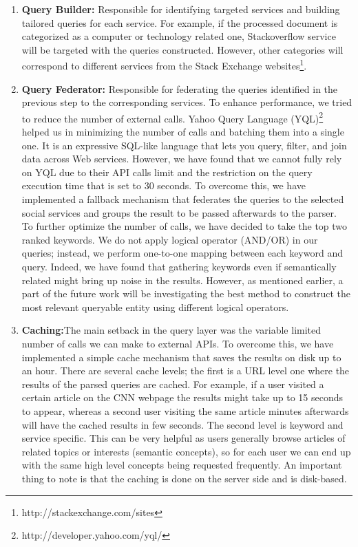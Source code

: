 \documentclass[onecolumn, crcready]{iosart2c}
\begin{document}
\begin{enumerate}
\item {\bf Query Builder:} Responsible for identifying targeted services and building tailored queries for each service. For example, if the processed document is categorized as a computer or technology related one, Stackoverflow service will be targeted with the queries constructed. However, other categories will correspond to different services from the Stack Exchange websites\footnote{http://stackexchange.com/sites}.
\item {\bf Query Federator:} Responsible for federating the queries identified in the previous step to the corresponding services. To enhance performance, we tried to reduce the number of external calls. Yahoo Query Language (YQL)\footnote{http://developer.yahoo.com/yql/} helped us in minimizing the number of calls and batching them into a single one. It is an expressive SQL-like language that lets you query, filter, and join data across Web services. However, we have found that we cannot fully rely on YQL due to their API calls limit and the restriction on the query execution time that is set to 30 seconds. To overcome this, we have implemented a fallback mechanism that federates the queries to the selected social services and groups the result to be passed afterwards to the parser. \\
To further optimize the number of calls, we have decided to take the top two ranked keywords. We do not apply logical operator (AND/OR) in our queries; instead, we perform one-to-one mapping between each keyword and query. Indeed, we have found that gathering keywords even if semantically related might bring up noise in the results. However, as mentioned earlier, a part of the future work will be investigating the best method to construct the most relevant queryable entity using different logical operators.
\item {\bf Caching:}The main setback in the query layer was the variable limited number of calls we can make to external APIs. To overcome this, we have implemented a simple cache mechanism that saves the results on disk up to an hour. There are several cache levels; the first is a URL level one where the results of the parsed queries are cached. For example, if a user visited a certain article on the CNN webpage the results might take up to 15 seconds to appear, whereas a second user visiting the same article minutes afterwards will have the cached results in few seconds. The second level is keyword and service specific. This can be very helpful as users generally browse articles of related topics or interests (semantic concepts), so for each user we can end up with the same high level concepts being requested frequently. An important thing to note is that the caching is done on the server side and is disk-based.
\end{enumerate}
\end{document}
